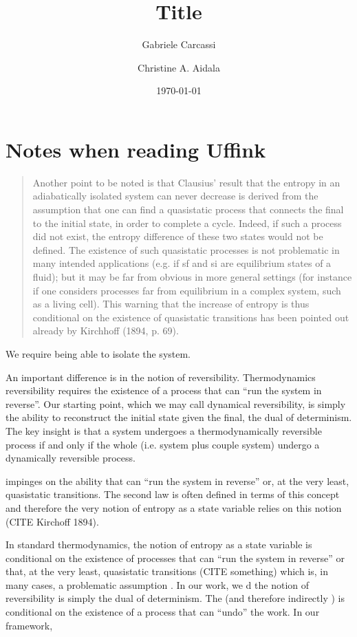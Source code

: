 \documentclass{article}
\title{Title}
\author[1]{Gabriele Carcassi}
\author[1]{Christine A. Aidala}
\affil[1]{
	Physics Department\\
	University of Michigan \\
	Ann Arbor, MI 48109
}
\date{\today}
\begin{document}
	
	
	
	
	
	\section{Notes when reading Uffink}
	


\begin{quote}
	Another point to be noted is that Clausius’ result that the entropy in an adiabatically isolated
	system can never decrease is derived from the assumption that one can find a quasistatic process
	that connects the final to the initial state, in order to complete a cycle. Indeed, if such a process
	did not exist, the entropy difference of these two states would not be defined. The existence of
	such quasistatic processes is not problematic in many intended applications (e.g. if sf and si are
	equilibrium states of a fluid); but it may be far from obvious in more general settings (for instance
	if one considers processes far from equilibrium in a complex system, such as a living cell). This
	warning that the increase of entropy is thus conditional on the existence of quasistatic transitions has
	been pointed out already by Kirchhoff (1894, p. 69).
\end{quote}
We require being able to isolate the system.

An important difference is in the notion of reversibility. Thermodynamics reversibility requires the existence of a process that can ``run the system in reverse''. Our starting point, which we may call dynamical reversibility, is simply the ability to reconstruct the initial state given the final, the dual of determinism. The key insight is that a system undergoes a thermodynamically reversible process if and only if the whole (i.e. system plus couple system) undergo a dynamically reversible process.

impinges on the ability that can ``run the system in reverse'' or, at the very least, quasistatic transitions. The second law is often defined in terms of this concept and therefore the very notion of entropy as a state variable relies on this notion (CITE Kirchoff 1894).


In standard thermodynamics, the notion of entropy as a state variable is conditional on the existence of processes that can ``run the system in reverse'' or that, at the very least, quasistatic transitions (CITE something) which is, in many cases, a problematic assumption .  In our work, we d the notion of reversibility is simply the dual of determinism. The  (and therefore indirectly ) is conditional on the existence of a process that can ``undo'' the work. In our framework, 
\end{document}
